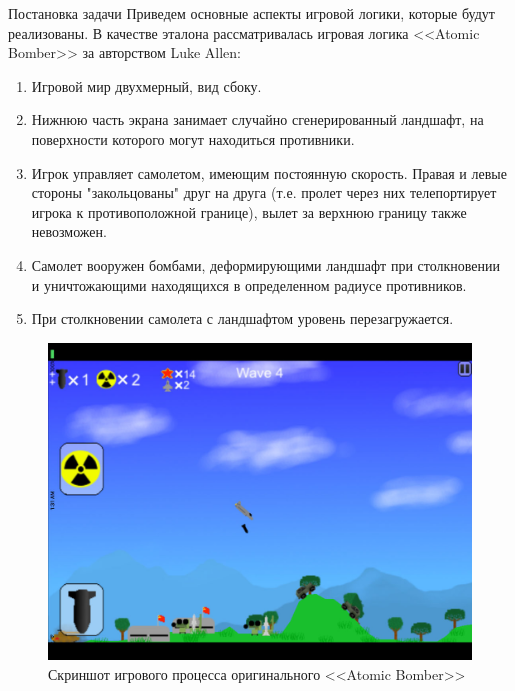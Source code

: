 \documentclass[a4paper, 14pt]{extarticle}
\numberwithin{equation}{section} %
\begin{document}
\begin{section}{Постановка задачи}
Приведем основные аспекты игровой логики, которые будут реализованы.
В качестве эталона рассматривалась игровая логика <<Atomic Bomber>> за авторством Luke Allen:

\begin{enumerate}
\item Игровой мир двухмерный, вид сбоку.
\item Нижнюю часть экрана занимает случайно сгенерированный ландшафт, на поверхности которого могут находиться противники.
\item Игрок управляет самолетом, имеющим постоянную скорость.
Правая и левые стороны "закольцованы" друг на друга (т.е. пролет через них телепортирует игрока к противоположной границе), вылет за верхнюю границу также невозможен.
\item Самолет вооружен бомбами, деформирующими ландшафт при столкновении и уничтожающими находящихся в определенном радиусе противников.
\item При столкновении самолета с ландшафтом уровень перезагружается.
\end{enumerate}

\begin{figure}[h]
\includegraphics[width=\linewidth]{atomic-bomber}
\caption{Скриншот игрового процесса оригинального <<Atomic Bomber>>}
\end{figure}
\end{section}
\end{document}
